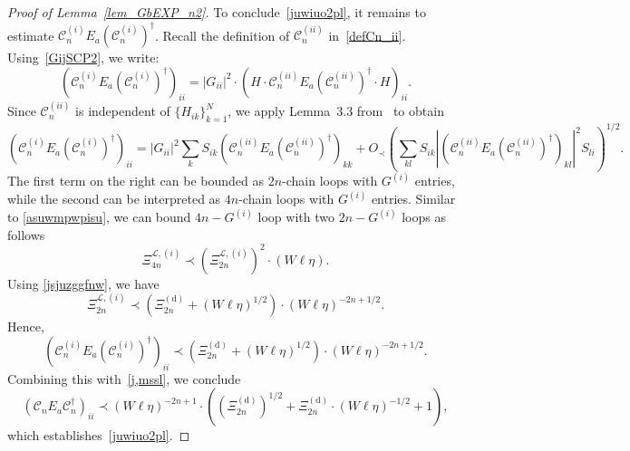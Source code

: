 \documentclass[10pt,reqno]{article}
\theoremstyle{plain} %
\theoremstyle{remark}
\numberwithin{equation}{section}
\begin{document}
\begin{proof}[Proof of Lemma~\ref{lem_GbEXP_n2}]
To conclude~\eqref{juwiuo2pl}, it remains to estimate \( \mathcal{C}_n^{(i)} E_a \left( \mathcal{C}_n^{(i)} \right)^\dagger \). Recall the definition of \( \mathcal{C}_n^{(ii)} \) in~\eqref{defCn_ii}. Using~\eqref{GijSCP2}, we write:
\[
\left( \mathcal{C}_n^{(i)} E_a \left( \mathcal{C}_n^{(i)} \right)^\dagger \right)_{ii}
= |G_{ii}|^2 \cdot \left( H \cdot \mathcal{C}_n^{(ii)} E_a \left( \mathcal{C}_n^{(ii)} \right)^\dagger \cdot H \right)_{ii}.
\]
Since \( \mathcal{C}_n^{(ii)} \) is independent of \( \{ H_{ik} \}_{k=1}^N \), we apply Lemma~3.3 from~\cite{erdHos2012rigidity} to obtain
\begin{equation}\label{rejdssaw2s}
\left( \mathcal{C}_n^{(i)} E_a \left( \mathcal{C}_n^{(i)} \right)^\dagger \right)_{ii}
= |G_{ii}|^2 \sum_k S_{ik} \left( \mathcal{C}_n^{(ii)} E_a \left( \mathcal{C}_n^{(ii)} \right)^\dagger \right)_{kk}
+ O_\prec \left( \sum_{kl} S_{ik} \left| \left( \mathcal{C}_n^{(ii)} E_a \left( \mathcal{C}_n^{(ii)} \right)^\dagger \right)_{kl} \right|^2 S_{li} \right)^{1/2}.
\end{equation}
The first term on the right can be bounded as   $2n$-chain loops with $G^{(i)}$ entries, while the second can be interpreted as   $4n$-chain loops with $G^{(i)}$ entries. Similar to \eqref{asuwmpwpisu}, we can bound $4n-G^{(i)}$ loop with two $2n-G^{(i)}$ loops as follows
\[
\Xi_{4n}^{\mathcal{L},(i)} \prec \left( \Xi_{2n}^{\mathcal{L},(i)} \right)^2 \cdot (W \ell \eta).
\]
Using \eqref{jsjuzggfnw}, we have 
\[ 
\Xi_{2n}^{\mathcal{L},(i)} \prec \left( \Xi_{2n}^{(\mathrm{d})} + (W \ell \eta)^{1/2} \right) \cdot (W \ell \eta)^{-2n + 1/2}.
\]
Hence,
\[
\left( \mathcal{C}_n^{(i)} E_a \left( \mathcal{C}_n^{(i)} \right)^\dagger \right)_{ii}
\prec \left( \Xi_{2n}^{(\mathrm{d})} + (W \ell \eta)^{1/2} \right) \cdot (W \ell \eta)^{-2n + 1/2}.
\]
Combining this with~\eqref{j,mssl}, we conclude
\[
\left( \mathcal{C}_n E_a \mathcal{C}_n^\dagger \right)_{ii}
\prec (W \ell \eta)^{-2n + 1} \cdot \left( \left( \Xi_{2n}^{(\mathrm{d})} \right)^{1/2} + \Xi_{2n}^{(\mathrm{d})} \cdot (W \ell \eta)^{-1/2} + 1 \right),
\]
which establishes~\eqref{juwiuo2pl}.

\bigskip


\end{proof}
\end{document}
